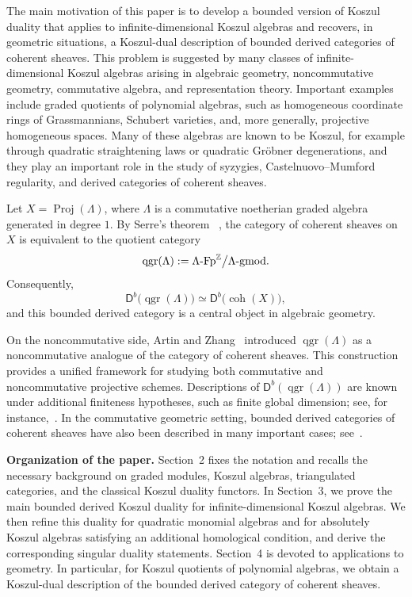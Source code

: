 \documentclass[11pt]{article}
\theoremstyle{definition}
\theoremstyle{remark}
\begin{document}
The main motivation of this paper is to develop a bounded version of Koszul duality that applies to infinite-dimensional Koszul algebras and recovers, in geometric situations, a Koszul-dual description of bounded derived categories of coherent sheaves. This problem is suggested by many classes of infinite-dimensional Koszul algebras arising in algebraic geometry, noncommutative geometry, commutative algebra, and representation theory. Important examples include graded quotients of polynomial algebras, such as homogeneous coordinate rings of Grassmannians, Schubert varieties, and, more generally, projective homogeneous spaces. Many of these algebras are known to be Koszul, for example through quadratic straightening laws or quadratic Gr\"obner degenerations, and they play an important role in the study of syzygies, Castelnuovo--Mumford regularity, and derived categories of coherent sheaves. 

\medskip 

Let \(X=\operatorname{Proj}(\Lambda)\), where \(\Lambda\) is a commutative noetherian graded algebra generated in degree \(1\). By Serre's theorem ~\cite{37}, the category of coherent sheaves on \(X\) is equivalent to the quotient category \[ \operatorname{qgr}(\Lambda) := \Lambda\textup{-}\mathrm{Fp}^{\mathbb{Z}} \big/ \Lambda\textup{-}\mathrm{gmod}. \] Consequently, \[ \mathsf{D}^{b}\!\bigl(\operatorname{qgr}(\Lambda)\bigr) \simeq \mathsf{D}^{b}\!\bigl(\operatorname{coh}(X)\bigr), \] and this bounded derived category is a central object in algebraic geometry. 

\medskip 

On the noncommutative side, Artin and Zhang~\cite{1} introduced \(\operatorname{qgr}(\Lambda)\) as a noncommutative analogue of the category of coherent sheaves. This construction provides a unified framework for studying both commutative and noncommutative projective schemes. Descriptions of \(\mathsf{D}^{b}(\operatorname{qgr}(\Lambda))\) are known under additional finiteness hypotheses, such as finite global dimension; see, for instance,~\cite{8,9,10}. In the commutative geometric setting, bounded derived categories of coherent sheaves have also been described in many important cases; see~\cite{3,6,26,32,33,34}. 

\medskip 

\noindent \textbf{Organization of the paper.} Section~2 fixes the notation and recalls the necessary background on graded modules, Koszul algebras, triangulated categories, and the classical Koszul duality functors. In Section~3, we prove the main bounded derived Koszul duality for infinite-dimensional Koszul algebras. We then refine this duality for quadratic monomial algebras and for absolutely Koszul algebras satisfying an additional homological condition, and derive the corresponding singular duality statements. Section~4 is devoted to applications to geometry. In particular, for Koszul quotients of polynomial algebras, we obtain a Koszul-dual description of the bounded derived category of coherent sheaves.
\end{document}
